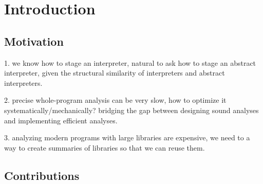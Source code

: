 \section{Introduction}

\subsection{Motivation}

1. we know how to stage an interpreter, natural to ask how to stage an abstract interpreter, given 
the structural similarity of interpreters and abstract interpreters.

2. precise whole-program analysis can be very slow, how to optimize it systematically/mechanically?
bridging the gap between designing sound analyses and implementing efficient analyses.

3. analyzing modern programs with large libraries are expensive, we need to a way to create
summaries of libraries so that we can reuse them.

\subsection{Contributions}
